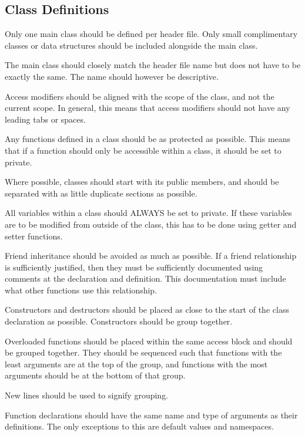 \documentclass[12pt,article]{memoir}
\begin{document}
\subsection{Class Definitions}
Only one main class should be defined per header file. Only small complimentary classes or data structures should be included alongside the main class.\par
The main class should closely match the header file name but does not have to be exactly the same. The name should however be descriptive.\par
Access modifiers should be aligned with the scope of the class, and not the current scope. In general, this means that access modifiers should not have any leading tabs or spaces.\par
Any functions defined in a class should be as protected as possible. This means that if a function should only be accessible within a class, it should be set to private.\par
Where possible, classes should start with its public members, and should be separated with as little duplicate sections as possible.\par
All variables within a class should ALWAYS be set to private. If these variables are to be modified from outside of the class, this has to be done using getter and setter functions.\par
Friend inheritance should be avoided as much as possible. If a friend relationship is sufficiently justified, then they must be sufficiently documented using comments at the declaration and definition. This documentation must include what other functions use this relationship.\par
Constructors and destructors should be placed as close to the start of the class declaration as possible. Constructors should be group together.\par
Overloaded functions should be placed within the same access block and should be grouped together. They should be sequenced such that functions with the least arguments are at the top of the group, and functions with the most arguments should be at the bottom of that group.\par
New lines should be used to signify grouping.\par
Function declarations should have the same name and type of arguments as their definitions. The only exceptions to this are default values and namespaces.\par

\newpage
\end{document}
